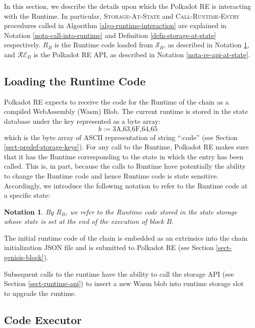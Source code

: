 \documentclass{book}
\newcommand{\assign}{:=}
\newcommand{\tmname}[1]{\textsc{#1}}
\newtheorem{notation}{Notation}
\newtheorem{notation}{Notation}
\begin{document}
In this section, we describe the details upon which the Polkadot RE is
interacting with the Runtime. In particular, {\tmname{Storage-At-State}} and
{\tmname{Call-Runtime-Entry}} procedures called in Algorithm
\ref{algo-runtime-interaction} are explained in Notation
\ref{nota-call-into-runtime} and Definition \ref{defn-storage-at-state}
respectively. $R_B$ is the Runtime code loaded from $\mathcal{S}_B$, as
described in Notation \ref{nota-runtime-code-at-state}, and
$\mathcal{R}\mathcal{E}_B$ is the Polkadot RE API, as described in Notation
\ref{nota-re-api-at-state}.

\subsection{Loading the Runtime Code \ \ }\label{sect-loading-runtime-code}

Polkadot RE expects to receive the code for the Runtime of the chain as a
compiled WebAssembly (Wasm) Blob. The current runtime is stored in the state
database under the key represented as a byte array:
\[ b \assign \text{3A,63,6F,64,65} \]
which is the byte array of ASCII representation of string ``:code'' (see
Section \ref{sect-predef-storage-keys}). For any call to the Runtime, Polkadot
RE makes sure that it has the Runtime corresponding to the state in which the
entry has been called. This is, in part, because the calls to Runtime have
potentially the ability to change the Runtime code and hence Runtime code is
state sensitive. Accordingly, we introduce the following notation to refer to
the Runtime code at a specific state:

\begin{notation}
  \label{nota-runtime-code-at-state}By $R_B$, we refer to the Runtime code
  stored in the state storage whose state is set at the end of the execution
  of block $B$.
\end{notation}

The initial runtime code of the chain is embedded as an extrinsics into the
chain initialization JSON file and is submitted to Polkadot RE (see Section
\ref{sect-genisis-block}).

Subsequent calls to the runtime have the ability to call the storage API (see
Section \ref{sect-runtime-api}) to insert a new Wasm blob into runtime storage
slot to upgrade the runtime.

\subsection{Code Executor}
\end{document}
